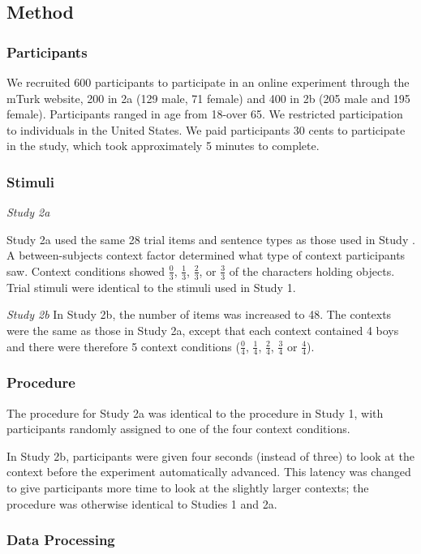 \documentclass[10pt,letterpaper]{article}
\begin{document}
\subsection{Method}

\subsubsection{Participants } 
We recruited 600 participants to participate in an online experiment through the mTurk website, 200 in 2a (129 male, 71 female) and  400 in 2b (205 male and 195 female). Participants ranged in age from 18-over 65.  We restricted participation to individuals in the United States. We paid participants 30 cents to participate in the study, which took approximately 5 minutes to complete.  

\subsubsection{Stimuli}
\emph{Study 2a} 

Study 2a used the same 28 trial items and sentence types as those used in Study .  A between-subjects context factor determined what type of context participants saw.  Context conditions showed $\frac{0}{3}$, $\frac{1}{3}$, $\frac{2}{3}$, or $\frac{3}{3}$ of the characters holding objects.  Trial stimuli were identical to the stimuli used in Study 1.  

\emph{Study 2b}
In Study 2b, the number of items was increased to 48.  The contexts were the same as those in Study 2a, except that each context contained 4 boys and there were therefore 5 context conditions ($\frac{0}{4}$, $\frac{1}{4}$, $\frac{2}{4}$, $\frac{3}{4}$ or $\frac{4}{4}$).  

\subsubsection{Procedure}
 The procedure for Study 2a was identical to the procedure in Study 1, with participants randomly assigned to one of the four context conditions.  
 
 In Study 2b, participants were given four seconds (instead of three) to look at the context before the experiment automatically advanced.  This latency was changed to give participants more time to look at the slightly larger contexts; the procedure was otherwise identical to Studies 1 and 2a.  
 
 \subsubsection{Data Processing}
\end{document}
